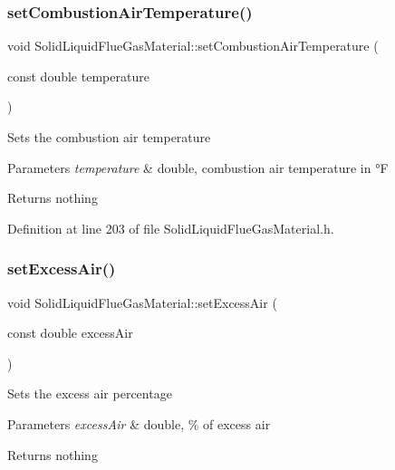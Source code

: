 \subsubsection{\texorpdfstring{set\+Combustion\+Air\+Temperature()}{setCombustionAirTemperature()}\hspace{0.1cm}{\footnotesize\ttfamily [3/3]}}
{\footnotesize\ttfamily void Solid\+Liquid\+Flue\+Gas\+Material\+::set\+Combustion\+Air\+Temperature (\begin{DoxyParamCaption}\item[{const double}]{temperature }\end{DoxyParamCaption})\hspace{0.3cm}{\ttfamily [inline]}}

Sets the combustion air temperature 
\begin{DoxyParams}{Parameters}
{\em temperature} & double, combustion air temperature in °F \\
\hline
\end{DoxyParams}
\begin{DoxyReturn}{Returns}
nothing 
\end{DoxyReturn}


Definition at line 203 of file Solid\+Liquid\+Flue\+Gas\+Material.\+h.

\mbox{\label{class_solid_liquid_flue_gas_material_a7a3f9f77d267afc05f5fde1da9329ec5}} 
\subsubsection{\texorpdfstring{set\+Excess\+Air()}{setExcessAir()}\hspace{0.1cm}{\footnotesize\ttfamily [1/3]}}
{\footnotesize\ttfamily void Solid\+Liquid\+Flue\+Gas\+Material\+::set\+Excess\+Air (\begin{DoxyParamCaption}\item[{const double}]{excess\+Air }\end{DoxyParamCaption})\hspace{0.3cm}{\ttfamily [inline]}}

Sets the excess air percentage 
\begin{DoxyParams}{Parameters}
{\em excess\+Air} & double, \% of excess air \\
\hline
\end{DoxyParams}
\begin{DoxyReturn}{Returns}
nothing 
\end{DoxyReturn}


